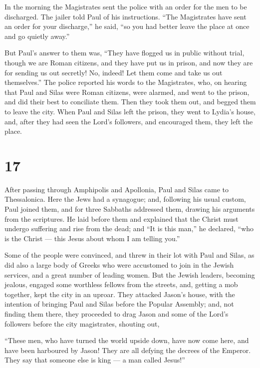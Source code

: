  In the morning the Magistrates sent the police with an
order for the men to be discharged.  The jailer told Paul
of his instructions. ``The Magistrates have sent an order for your
discharge,'' he said, ``so you had better leave the place at once and go
quietly away.''

 But Paul's answer to them was, ``They have flogged us in
public without trial, though we are Roman citizens, and they have put us
in prison, and now they are for sending us out secretly! No, indeed! Let
them come and take us out themselves.''  The police
reported his words to the Magistrates, who, on hearing that Paul and
Silas were Roman citizens, were alarmed,  and went to the
prison, and did their best to conciliate them. Then they took them out,
and begged them to leave the city.  When Paul and Silas
left the prison, they went to Lydia's house, and, after they had seen
the Lord's followers, and encouraged them, they left the place.

\hypertarget{section-16}{%
\section{17}\label{section-16}}

 After passing through Amphipolis and Apollonia, Paul and
Silas came to Thessalonica. Here the Jews had a synagogue; 
and, following his usual custom, Paul joined them, and for three
Sabbaths addressed them, drawing his arguments from the scriptures.
 He laid before them and explained that the Christ must
undergo suffering and rise from the dead; and ``It is this man,'' he
declared, ``who is the Christ --- this Jesus about whom I am telling
you.''

 Some of the people were convinced, and threw in their lot
with Paul and Silas, as did also a large body of Greeks who were
accustomed to join in the Jewish services, and a great number of leading
women.  But the Jewish leaders, becoming jealous, engaged
some worthless fellows from the streets, and, getting a mob together,
kept the city in an uproar. They attacked Jason's house, with the
intention of bringing Paul and Silas before the Popular Assembly;
 and, not finding them there, they proceeded to drag Jason
and some of the Lord's followers before the city magistrates, shouting
out,

``These men, who have turned the world upside down, have now come here,
 and have been harboured by Jason! They are all defying the
decrees of the Emperor. They say that someone else is king --- a man
called Jesus!''

